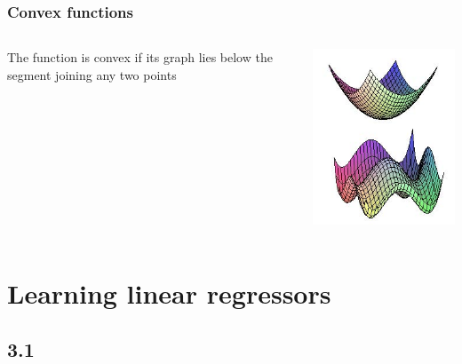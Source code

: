 \documentclass[default]{beamer}
\begin{document}
	\begin{frame}
		\frametitle{Convex functions}
		
		\begin{columns}
			\Large
			\begin{column}{0.5\textwidth}
				The function is convex if its graph lies below the segment joining any two points
			\end{column}
			\begin{column}{0.5\textwidth}
				\centering
				\includegraphics[width=\textwidth]{linear_17.jpg}
			\end{column}
		
		\end{columns}
	
		
	\end{frame}
		

	\section{Learning linear regressors}
	\subsection{3.1}
	
\end{document}
